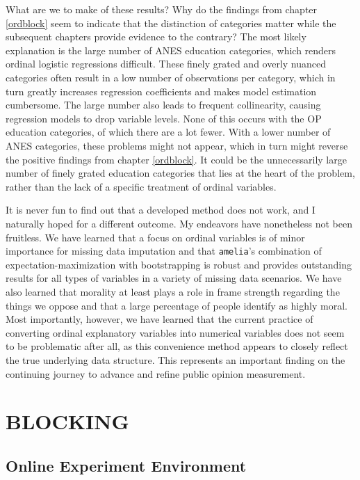 \documentclass[12pt,econ]{sources/authesis}
\begin{document}
What are we to make of these results? Why do the findings from chapter \ref{ordblock} seem to indicate that the distinction of categories matter while the subsequent chapters provide evidence to the contrary? The most likely explanation is the large number of ANES education categories, which renders ordinal logistic regressions difficult. These finely grated and overly nuanced categories often result in a low number of observations per category, which in turn greatly increases regression coefficients and makes model estimation cumbersome. The large number also leads to frequent collinearity, causing regression models to drop variable levels. None of this occurs with the OP education categories, of which there are a lot fewer. With a lower number of ANES categories, these problems might not appear, which in turn might reverse the positive findings from chapter \ref{ordblock}. It could be the unnecessarily large number of finely grated education categories that lies at the heart of the problem, rather than the lack of a specific treatment of ordinal variables.

It is never fun to find out that a developed method does not work, and I naturally hoped for a different outcome. My endeavors have nonetheless not been fruitless. We have learned that a focus on ordinal variables is of minor importance for missing data imputation and that \texttt{amelia}'s combination of expectation-maximization with bootstrapping is robust and provides outstanding results for all types of variables in a variety of missing data scenarios. We have also learned that morality at least plays a role in frame strength regarding the things we oppose and that a large percentage of people identify as highly moral. Most importantly, however, we have learned that the current practice of converting ordinal explanatory variables into numerical variables does not seem to be problematic after all, as this convenience method appears to closely reflect the true underlying data structure. This represents an important finding on the continuing journey to advance and refine public opinion measurement.

\appendix

\hypertarget{app-ordblock}{%
\chapter{BLOCKING}\label{app-ordblock}}

\hypertarget{app-ordblock-env}{%
\section{Online Experiment Environment}\label{app-ordblock-env}}
\end{document}
